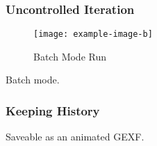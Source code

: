 \subsubsection{Uncontrolled Iteration}
\begin{figure}
  \centering
  \texttt{[image: example-image-b]}
  \caption{Batch Mode Run}
  \label{fig:iface:alg-test-batch}
\end{figure}
\begin{draftvspace}{2in}
  Batch mode.
\end{draftvspace}
\subsubsection{Keeping History}
\begin{draftvspace}{1in}
  Saveable as an animated GEXF.
\end{draftvspace}


